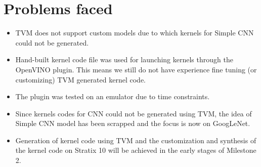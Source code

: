 \documentclass[titlepage]{report}
\begin{document}
\chapter{Problems faced}
\begin{itemize}
    
\item TVM does not support custom models due to which kernels for Simple CNN could not be generated.

\item Hand-built kernel code file was used for launching kernels through the OpenVINO plugin. This means we still do not have experience fine tuning (or customizing) TVM generated kernel code.

\item The plugin was tested on an emulator due to time constraints. 

\item Since kernels codes for CNN could not be generated using TVM, the idea of Simple CNN model has been scrapped and the focus is now on GoogLeNet.

\item Generation of kernel code using TVM and the customization and synthesis of the kernel code on Stratix 10 will be achieved in the early stages of Milestone 2.

    

\end{itemize}
\end{document}
